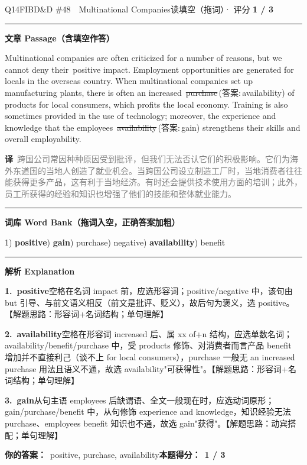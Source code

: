 \documentclass[11pt]{article}
\newcommand{\ptesub}[1]{%
  \par\needspace{2\baselineskip}\smallskip
  {\color{cAccent}\rule[-0.2ex]{3pt}{1.05em}}\hspace{6pt}%
  {\bfseries\color{cHead}#1}\par\nopagebreak\smallskip}
\newcommand{\zh}[1]{{\footnotesize\textcolor{cNote}{\textbf{译}}\ \textcolor{gray}{#1}}}
\newcommand{\rok}[1]{{\color{cFix}\ding{51}\,#1}}                 %
\newcommand{\rno}[2]{{\color{cWrong}\ding{55}\,\sout{#1}}\,{\footnotesize\color{cFix}(答案:\,#2)}}  %
\begin{document}
\begin{qblock}{Q14\quad FIBD\&D \#48\ \ Multinational Companies}{读填空（拖词）· 评分 \textcolor{cAccent}{\bfseries 1 / 3}}
\ptesub{文章 Passage（含填空作答）}
\begin{promptbox}
Multinational companies are often criticized for a number of reasons, but we cannot deny their \rok{positive} impact. Employment opportunities are generated for locals in the overseas country. When multinational companies set up manufacturing plants, there is often an increased \rno{purchase}{availability} of products for local consumers, which profits the local economy. Training is also sometimes provided in the use of technology; moreover, the experience and knowledge that the employees \rno{availability}{gain} strengthens their skills and overall employability.
\end{promptbox}
\zh{跨国公司常因种种原因受到批评，但我们无法否认它们的积极影响。它们为海外东道国的当地人创造了就业机会。当跨国公司设立制造工厂时，当地消费者往往能获得更多产品，这有利于当地经济。有时还会提供技术使用方面的培训；此外，员工所获得的经验和知识也增强了他们的技能和整体就业能力。}
\ptesub{词库 Word Bank（拖词入空，正确答案加粗）}
{\small 1) \textbf{positive}) \textbf{gain}) purchase) negative) \textbf{availability}) benefit}
\ptesub{解析 Explanation}
\begin{notebox}\footnotesize
\textbf{1.\ positive}\quad 空格在名词 impact 前，应选形容词；positive/negative 中，该句由 but 引导、与前文语义相反（前文是批评、贬义），故后句为褒义，选 positive。【解题思路：形容词+名词结构；单句理解】\par\smallskip
\textbf{2.\ availability}\quad 空格在形容词 increased 后、属 xx of+n 结构，应选单数名词；availability/benefit/purchase 中，受 products 修饰、对消费者而言产品 benefit 增加并不直接利己（谈不上 for local consumers），purchase 一般无 an increased purchase 用法且语义不通，故选 availability"可获得性"。【解题思路：形容词+名词结构；单句理解】\par\smallskip
\textbf{3.\ gain}\quad 从句主语 employees 后缺谓语、全文一般现在时，应选动词原形；gain/purchase/benefit 中，从句修饰 experience and knowledge，知识经验无法 purchase、employees benefit 知识也不通，故选 gain"获得"。【解题思路：动宾搭配；单句理解】
\end{notebox}
\smallskip
\textbf{你的答案：}\ positive, {\color{cWrong}purchase, availability}\qquad\textbf{本题得分：}\ {\color{cAccent}\bfseries 1 / 3}
\end{qblock}
\end{document}
